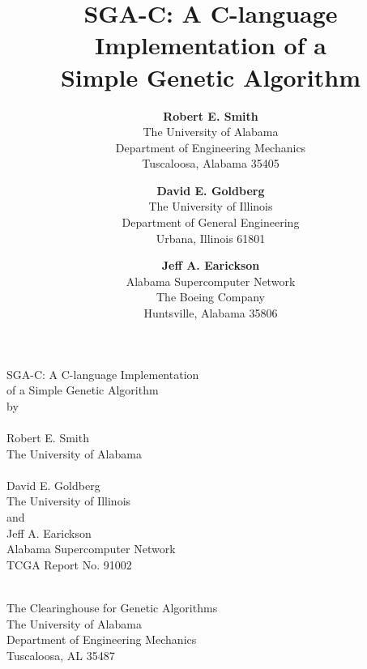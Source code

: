 \pagestyle{empty}

\oddsidemargin=0in
\evensidemargin=0in
\topmargin=0.5in
\textheight=9in
\textwidth=6.5in 
\footheight=0in
\columnsep=0.25in
\headsep=0in
\headheight=0in

\def\btt#1{\bf{\tt #1}}




\begin{titlepage}
\begin{center}
\vspace*{2.35in}
SGA-C: A C-language Implementation \\ 
of a Simple Genetic Algorithm
\ \\
by\\
\ \\
Robert E. Smith\\
The University of Alabama\\
\ \\ 
David E. Goldberg\\
The University of Illinois\\
and\\
Jeff A. Earickson\\
Alabama Supercomputer Network\\
\vspace{0.7in}
TCGA Report No. 91002\\
\date{}\\
\vspace{2.2in}
The Clearinghouse for Genetic Algorithms\\
The University of Alabama\\
Department of Engineering Mechanics\\
Tuscaloosa, AL 35487
\end{center}
\end{titlepage}


\title{SGA-C: A C-language Implementation of a\\ 
Simple Genetic Algorithm}
\author{{\bf Robert E. Smith}\\
The University of Alabama\\
Department of Engineering Mechanics\\
Tuscaloosa, Alabama 35405 
\and {\bf David E. Goldberg}\\
The University of Illinois\\
Department of General Engineering\\
Urbana, Illinois 61801
\and {\bf Jeff A. Earickson}\\
Alabama Supercomputer Network\\
The Boeing Company\\
Huntsville, Alabama 35806}
\maketitle

